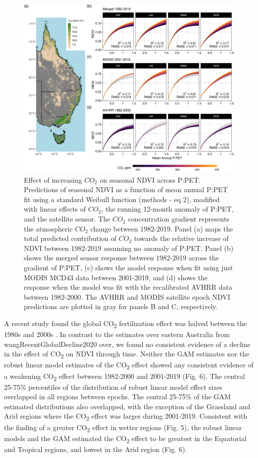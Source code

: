 \documentclass[gc, manuscript]{copernicus}
\begin{document}
\clearpage
\begin{figure}
\includegraphics[width=12cm]{../../figures/Fig5_n4_ndvi_map_weibull_ppet_x_co2_modeled_effect} \caption{Effect of increasing $CO_2$ on seasonal NDVI across P:PET. Predictions of seasonal NDVI as a function of mean annual P:PET fit using a standard Weibull function (methods - eq 2), modified with linear effects of $CO_2$, the running 12-month anomaly of P:PET, and the satellite sensor. The $CO_2$ concentration gradient represents the atmospheric $CO_2$ change between 1982-2019. Panel (a) maps the total predicted contribution of $CO_2$ towards the relative increase of NDVI between 1982-2019 assuming no anomaly of P:PET. Panel (b) shows the merged sensor response between 1982-2019 across the gradient of P:PET, (c) shows the model response when fit using just MODIS MCD43 data between 2001-2019, and (d) shows the response when the model was fit with the recalibrated AVHRR data between 1982-2000. The AVHRR and MODIS satellite epoch NDVI predictions are plotted in gray for panels B and C, respectively.}\label{fig:unnamed-chunk-4}
\end{figure}
\clearpage

A recent study found the global CO\textsubscript{2} fertilization effect
was halved between the 1980s and 2000s
\citep{wangRecentGlobalDecline2020}. In contrast to the estimates over
eastern Australia from wangRecentGlobalDecline2020 over, we found no
consistent evidence of a decline in the effect of CO\textsubscript{2} on
NDVI through time. Neither the GAM estimates nor the robust linear model
estimates of the CO\textsubscript{2} effect showed any consistent
evidence of a weakening CO\textsubscript{2} effect between 1982-2000 and
2001-2019 (Fig. 6). The central 25-75\% percentiles of the distribution
of robust linear model effect sizes overlapped in all regions between
epochs. The central 25-75\% of the GAM estimated distributions also
overlapped, with the exception of the Grassland and Arid regions where
the CO\textsubscript{2} effect was larger during 2001-2019. Consistent
with the finding of a greater CO\textsubscript{2} effect in wetter
regions (Fig. 5), the robust linear models and the GAM estimated the
CO\textsubscript{2} effect to be greatest in the Equatorial and Tropical
regions, and lowest in the Arid region (Fig. 6).
\end{document}
